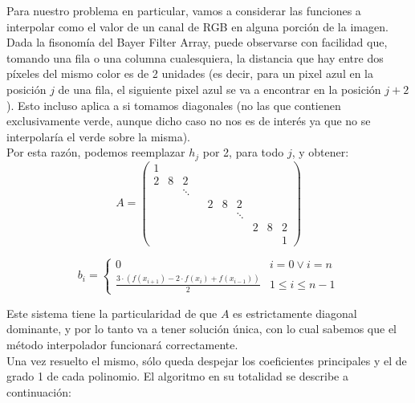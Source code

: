 \documentclass[a4paper]{article}
\begin{document}
Para nuestro problema en particular, vamos a considerar las funciones a interpolar como el valor de un canal de RGB en alguna porción de la imagen. Dada la fisonomía del Bayer Filter Array, puede observarse con facilidad que, tomando una fila o una columna cualesquiera, la distancia que hay entre dos píxeles del mismo color es de 2 unidades (es decir, para un pixel azul en la posición $j$ de una fila, el siguiente pixel azul se va a encontrar en la posición $j+2$). Esto incluso aplica a si tomamos diagonales (no las que contienen exclusivamente verde, aunque dicho caso no nos es de interés ya que no se interpolaría el verde sobre la misma). \\
Por esta razón, podemos reemplazar $h_j$ por 2, para todo $j$, y obtener: \\

\[
A = \left(
\begin{array}{cccccccccc}
1 &  &  &  &  &  &  & &  & \\
2 & 8 & 2 &   & & & & &  & \\
 &  & \ddots &  &  &  &  &  &  &  \\
 &  &  &  & 2 & 8 & 2 & &  & \\
 &  &  &  &  &  & \ddots &  &  &  \\
 &  &  &  &  & & & 2 & 8 & 2\\
 &  &  &  &  &  &  &  &  & 1
\end{array}
\right)
\]

\bigskip

\[
b_i =
\begin{cases}
0 & i = 0 \lor i = n \\
\frac{3\cdot(f(x_{i+1})-2\cdot f(x_i)+f(x_{i-1}))}{2} & 1 \leq i \leq n-1
\end{cases}
\]

\bigskip
Este sistema tiene la particularidad de que $A$ es estrictamente diagonal dominante, y por lo tanto va a tener solución única, con lo cual sabemos que el método interpolador funcionará correctamente. \\

Una vez resuelto el mismo, sólo queda despejar los coeficientes principales y el de grado 1 de cada polinomio. El algoritmo en su totalidad se describe a continuación:
\end{document}
